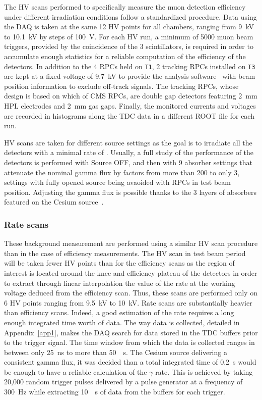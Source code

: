 	The HV scans performed to specifically measure the muon detection efficiency under different irradiation conditions follow a standardized procedure. Data using the DAQ is taken at the same 12 HV points for all chambers, ranging from \SI{9}{kV} to \SI{10.1}{kV} by steps of \SI{100}{V}. For each HV run, a minimum of 5000 muon beam triggers, provided by the coincidence of the 3 scintillators, is required in order to accumulate enough statistics for a reliable computation of the efficiency of the detectors. In addition to the 4 RPCs held on \texttt{T1}, 2 tracking RPCs installed on \texttt{T3} are kept at a fixed voltage of \SI{9,7}{kV} to provide the analysis software~\cite{GIFOffline} with beam position information to exclude off-track signals. The tracking RPCs, whose design is based on which of CMS RPCs, are double gap detectors featuring \SI{2}{mm} HPL electrodes and \SI{2}{mm} gas gaps. Finally, the monitored currents and voltages are recorded in histograms along the TDC data in a different ROOT file for each run.
	
	HV scans are taken for different source settings as the goal is to irradiate all the detectors with a minimal rate of . Usually, a full study of the performance of the detectors is performed with Source OFF, and then with 9 absorber settings that attenuate the nominal gamma flux by factors from more than 200 to only 3, settings with fully opened source being avaoided with RPCs in test beam position. Adjusting the gamma flux is possible thanks to the 3 layers of absorbers featured on the Cesium source~\cite{GIFFILTERS}.
	
		\subsubsection{Rate scans}
		\label{chapt5:sssec:ratescan}
		
	These background measurement are performed using a similar HV scan procedure than in the case of efficiency measurements. The HV scan in test beam period will be taken fewer HV points than for the efficiency scans as the region of interest is located around the knee and efficiency plateau of the detectors in order to extract through linear interpolation the value of the rate at the working voltage deduced from the efficiency scan. Thus, these scans are performed only on 6 HV points ranging from \SI{9.5}{kV} to \SI{10}{kV}. Rate scans are substantially heavier than efficiency scans. Indeed, a good estimation of the rate requires a long enough integrated time worth of data. The way data is collected, detailed in Appendix~\ref{app1}, makes the DAQ search for data stored in the TDC buffers prior to the trigger signal. The time window from which the data is collected ranges in between only \SI{25}{ns} to more than \SI{50}{\mu s}. The Cesium source delivering a consistent gamma flux, it was decided than a total integrated time of \SI{0.2}{s} would be enough to have a reliable calculation of the $\gamma$ rate. This is achieved by taking 20,000 random trigger pulses delivered by a pulse generator at a frequency of \SI{300}{Hz} while extracting \SI{10}{\mu s} of data from the buffers for each trigger.
		
